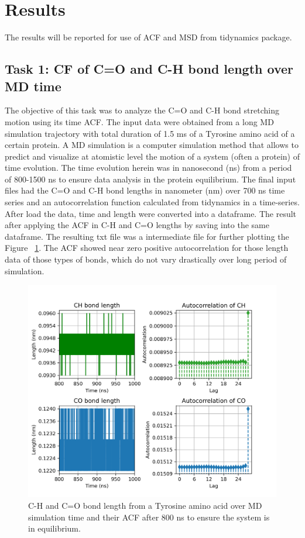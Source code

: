 \documentclass{article}
\begin{document}
\section{Results}

The results will be reported for use of ACF and MSD from tidynamics package\cite{Buyl2018}.

\subsection{Task 1: CF of C=O and C-H bond length over MD time}

The objective of this task was to analyze the C=O and C-H bond stretching motion using its time ACF. The input data were obtained from a long MD simulation trajectory with total duration of 1.5 ms of a Tyrosine amino acid of a certain protein. A MD simulation is a computer simulation method that allows to predict and visualize at atomistic level the motion of a system (often a protein) of time evolution. The time evolution herein was in nanosecond (ns) from a period of 800-1500 ns to ensure data analysis in the protein equilibrium. The final input files had the C=O and C-H bond lengths in nanometer (nm) over 700 ns time series and an autocorrelation function calculated from tidynamics \cite{Buyl2018}in a time-series. After load the data, time and length were converted into a dataframe. The result after applying the ACF in C-H and C=O lengths by saving into the same dataframe. The resulting txt file was a intermediate file for further plotting the Figure ~\ref{fig:acf_plot}. The ACF showed near zero positive autocorrelation for those length data of those types of bonds, which do not vary drastically over long period of simulation.

\begin{figure}[H]
\includegraphics[width=\linewidth]{CO_CH_length_acf_plot.png}
\caption{C-H and C=O bond length from a Tyrosine amino acid over MD simulation time and their ACF after 800 ns to ensure the system is in equilibrium.}
\label{fig:acf_plot}
\end{figure}
\end{document}
